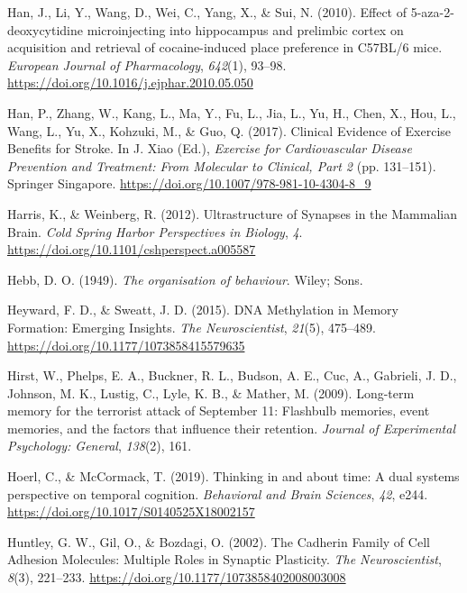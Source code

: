 \documentclass[
  jou,
  floatsintext,
  longtable,
  nolmodern,
  notxfonts,
  notimes,
  donotrepeattitle,
  colorlinks=true,linkcolor=blue,citecolor=blue,urlcolor=blue]{apa7}
\newlength{\cslhangindent}
\newenvironment{CSLReferences}[2] %
 {\begin{list}{}{%
  \setlength{\itemindent}{0pt}
  \setlength{\leftmargin}{0pt}
  \setlength{\parsep}{0pt}
  \ifodd #1
   \setlength{\leftmargin}{\cslhangindent}
   \setlength{\itemindent}{-1\cslhangindent}
  \fi
  \setlength{\itemsep}{#2\baselineskip}}}
 {\end{list}}
\begin{document}
\begin{CSLReferences}{1}{0}
Han, J., Li, Y., Wang, D., Wei, C., Yang, X., \& Sui, N. (2010). Effect
of 5-aza-2-deoxycytidine microinjecting into hippocampus and prelimbic
cortex on acquisition and retrieval of cocaine-induced place preference
in {C57BL}/6 mice. \emph{European Journal of Pharmacology},
\emph{642}(1), 93--98.
\url{https://doi.org/10.1016/j.ejphar.2010.05.050}

Han, P., Zhang, W., Kang, L., Ma, Y., Fu, L., Jia, L., Yu, H., Chen, X.,
Hou, L., Wang, L., Yu, X., Kohzuki, M., \& Guo, Q. (2017). Clinical
{Evidence} of {Exercise} {Benefits} for {Stroke}. In J. Xiao (Ed.),
\emph{Exercise for {Cardiovascular} {Disease} {Prevention} and
{Treatment}: {From} {Molecular} to {Clinical}, {Part} 2} (pp. 131--151).
Springer Singapore. \url{https://doi.org/10.1007/978-981-10-4304-8_9}

Harris, K., \& Weinberg, R. (2012). Ultrastructure of {Synapses} in the
{Mammalian} {Brain}. \emph{Cold Spring Harbor Perspectives in Biology},
\emph{4}. \url{https://doi.org/10.1101/cshperspect.a005587}

Hebb, D. O. (1949). \emph{The organisation of behaviour}. Wiley; Sons.

Heyward, F. D., \& Sweatt, J. D. (2015). {DNA} {Methylation} in {Memory}
{Formation}: {Emerging} {Insights}. \emph{The Neuroscientist},
\emph{21}(5), 475--489. \url{https://doi.org/10.1177/1073858415579635}

Hirst, W., Phelps, E. A., Buckner, R. L., Budson, A. E., Cuc, A.,
Gabrieli, J. D., Johnson, M. K., Lustig, C., Lyle, K. B., \& Mather, M.
(2009). Long-term memory for the terrorist attack of {September} 11:
Flashbulb memories, event memories, and the factors that influence their
retention. \emph{Journal of Experimental Psychology: General},
\emph{138}(2), 161.

Hoerl, C., \& McCormack, T. (2019). Thinking in and about time: {A} dual
systems perspective on temporal cognition. \emph{Behavioral and Brain
Sciences}, \emph{42}, e244.
\url{https://doi.org/10.1017/S0140525X18002157}

Huntley, G. W., Gil, O., \& Bozdagi, O. (2002). The {Cadherin} {Family}
of {Cell} {Adhesion} {Molecules}: {Multiple} {Roles} in {Synaptic}
{Plasticity}. \emph{The Neuroscientist}, \emph{8}(3), 221--233.
\url{https://doi.org/10.1177/1073858402008003008}


\end{CSLReferences}
\end{document}

